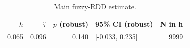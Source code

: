 \begin{table}[htbp]
\centering
\caption{Main fuzzy-RDD estimate.}
\label{tab:tab-main}
\begin{tabular}{rrrlr}
\toprule
$h$ & $\hat\tau$ & $p$ (robust) & 95\% CI (robust) & N in h \\
\midrule
0.065 & 0.096 & 0.140 & [-0.033, 0.235] & 9999 \\
\bottomrule
\end{tabular}
\end{table}

